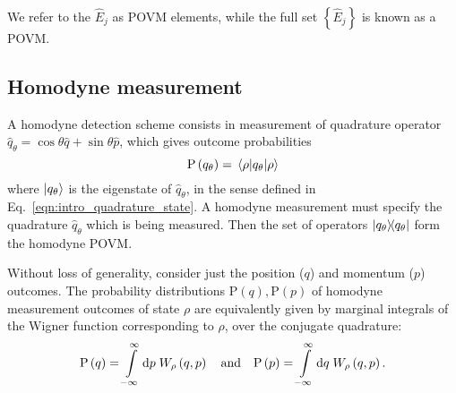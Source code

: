 \noindent We refer to the $\hat{E}_j$ as POVM elements, while the full set $\left\{\hat{E}_j\right\}$ is known as a POVM.



\FloatBarrier
\subsection{Homodyne measurement}
A homodyne detection scheme consists in measurement of quadrature operator $\hat{q}_\theta = \cos\theta \hat{q} + \sin\theta \hat{p}$, which gives outcome probabilities
\begin{equation}
\text{P}\left(q_\theta\right) = \ev{q_\theta}{\rho}
\end{equation}
where $\ket{q_\theta}$ is the eigenstate of $\hat{q}_\theta$, in the sense defined in Eq.~\ref{eqn:intro_quadrature_state}. A homodyne measurement must specify the quadrature $\hat{q}_\theta$ which is being measured. Then the set of operators $\dyad{q_\theta}$ form the homodyne POVM.

Without loss of generality, consider just the position ($q$) and momentum ($p$) outcomes. The probability distributions $\text{P}\left(q\right), \text{P}\left(p\right)$ of homodyne measurement outcomes of state $\rho$ are equivalently given by marginal integrals of the Wigner function corresponding to $\rho$, over the conjugate quadrature:
\begin{equation}
\text{P}\left(q\right) = \int\limits_{-\infty}^\infty \mathrm{d}p \; W_\rho\left(q, p\right) \qq{and} \text{P}\left(p\right) = \int\limits_{-\infty}^\infty \mathrm{d}q \; W_\rho\left(q, p\right).
\end{equation}


